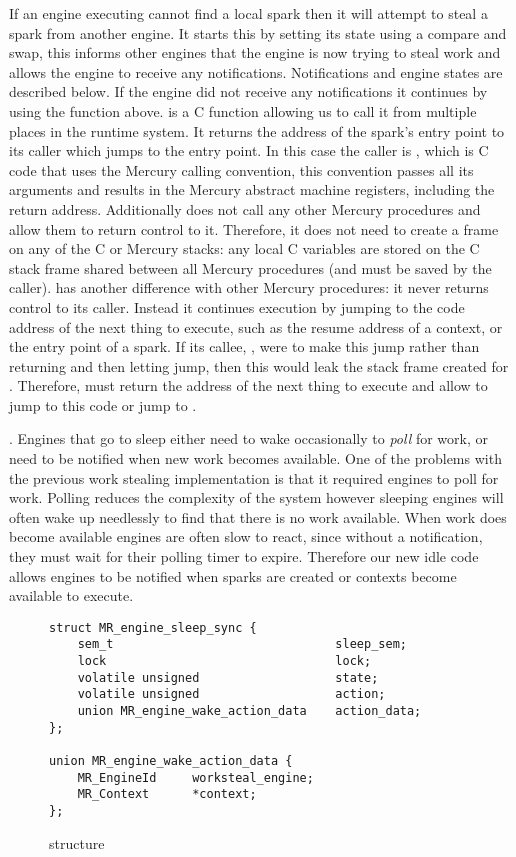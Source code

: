If an engine executing \idle cannot find a local spark then it will attempt
to steal a spark from another engine.
It starts this by setting its state using a compare and swap,
this informs other engines that the engine is now trying to steal work and
allows the engine to receive any notifications.
Notifications and engine states are described below.
If the engine did not receive any notifications it continues by using the
\trystealspark function above.
\trystealspark is a C function allowing us to call it from multiple places
in the runtime system.
It returns the address of the spark's entry point to its caller which jumps
to the entry point.
In this case the caller is \idle,
which is C code that uses the Mercury calling convention,
this convention passes all its arguments and results in the Mercury abstract
machine registers, including the return address.
Additionally \idle does not call any other Mercury procedures and allow them
to return control to it.
Therefore, it does not need to create a frame on any of the C or Mercury stacks:
any local C variables are stored on the C stack frame shared between all
Mercury procedures (and must be saved by the caller).
\idle has another difference with other Mercury procedures:
it never returns control to its caller.
Instead it continues execution by jumping to the code address of the next
thing to execute,
such as the resume address of a context,
or the entry point of a spark.
If its callee, \trystealspark, were to make this jump rather than
returning and then letting \idle jump,
then this would leak the stack frame created for \trystealspark.
Therefore, \trystealspark must return the address of the next thing to
execute and allow \idle to jump to this code or jump to \sleep.

.
Engines that go to sleep either need to wake occasionally to \emph{poll} for
work,
or need to be notified when new work becomes available.
One of the problems with the previous work stealing implementation is
that it required engines to poll for work.
Polling reduces the complexity of the system however
sleeping engines will often wake up needlessly to find that there is no
work available.
When work does become available engines are often slow to react,
since without a notification, they must wait for their polling timer to
expire.
Therefore our new idle code allows engines to be notified when 
sparks are created or contexts become available to execute.

\begin{figure}
\begin{verbatim}
struct MR_engine_sleep_sync {
    sem_t                               sleep_sem;
    lock                                lock;
    volatile unsigned                   state;
    volatile unsigned                   action;
    union MR_engine_wake_action_data    action_data;
};

union MR_engine_wake_action_data {
    MR_EngineId     worksteal_engine;
    MR_Context      *context;
};
\end{verbatim}
\caption{\enginesleepsync structure}
\label{fig:engine_sleep_sync}
\end{figure}

